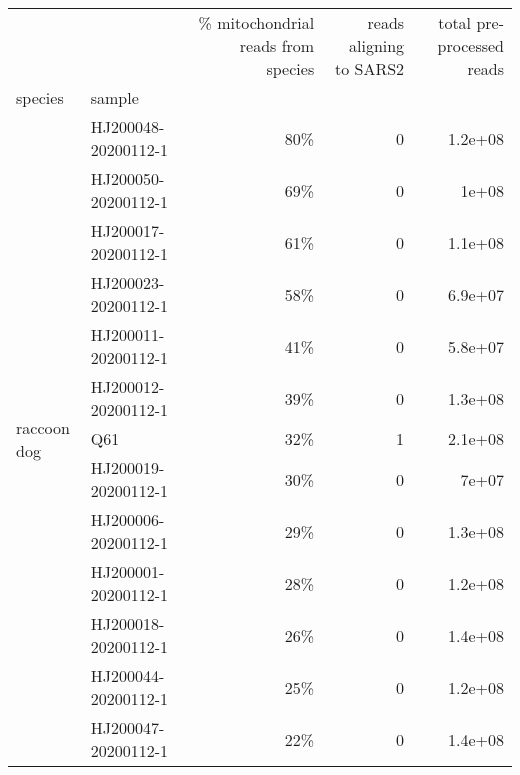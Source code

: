 \begin{tabular}{llrrr}
\toprule
                 &                     & \% mitochondrial reads from species &  reads aligning to SARS2 & total pre-processed reads \\
species & sample &                                    &                          &                           \\
\midrule
\multirow{14}{*}{raccoon dog} & HJ200048-20200112-1 &                                80\% &                        0 &                   1.2e+08 \\
                 & HJ200050-20200112-1 &                                69\% &                        0 &                     1e+08 \\
                 & HJ200017-20200112-1 &                                61\% &                        0 &                   1.1e+08 \\
                 & HJ200023-20200112-1 &                                58\% &                        0 &                   6.9e+07 \\
                 & HJ200011-20200112-1 &                                41\% &                        0 &                   5.8e+07 \\
                 & HJ200012-20200112-1 &                                39\% &                        0 &                   1.3e+08 \\
                 & Q61 &                                32\% &                        1 &                   2.1e+08 \\
                 & HJ200019-20200112-1 &                                30\% &                        0 &                     7e+07 \\
                 & HJ200006-20200112-1 &                                29\% &                        0 &                   1.3e+08 \\
                 & HJ200001-20200112-1 &                                28\% &                        0 &                   1.2e+08 \\
                 & HJ200018-20200112-1 &                                26\% &                        0 &                   1.4e+08 \\
                 & HJ200044-20200112-1 &                                25\% &                        0 &                   1.2e+08 \\
                 & HJ200047-20200112-1 &                                22\% &                        0 &                   1.4e+08 \\

\end{tabular}
